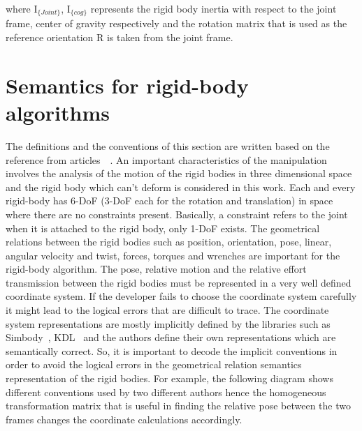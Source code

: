 where I$_{\{Joint\}}$, I$_{\{cog\}}$ represents the rigid body inertia with respect to the joint frame, center of gravity respectively and the rotation matrix that is used as the reference orientation R is taken from the joint frame. 

\section{Semantics for rigid-body algorithms}

The definitions and the conventions of this section are written based on the reference from articles~\cite{geometicsemanticspart1}~\cite{geometicsemanticspart2}. An important characteristics of the manipulation involves the analysis of the motion of the rigid bodies in three dimensional space and the rigid body which can't deform is considered in this work. Each and every rigid-body has 6-DoF (3-DoF each for the rotation and translation) in space where there are no constraints present. Basically, a constraint refers to the joint when it is attached to the rigid body, only 1-DoF exists. The geometrical relations between the rigid bodies such as position, orientation, pose, linear, angular velocity and twist, forces, torques and wrenches are important for the rigid-body algorithm. The pose, relative motion and the relative effort transmission between the rigid bodies must be represented in a very well defined coordinate system. If the developer fails to choose the coordinate system carefully it might lead to the logical errors that are difficult to trace. The coordinate system representations are mostly implicitly defined by the libraries such as Simbody~\cite{sherman2011simbody}, KDL~\cite{smits2011kdl} and the authors define their own representations which are semantically correct. So, it is important to decode the implicit conventions in order to avoid the logical errors in the geometrical relation semantics representation of the rigid bodies. For example, the following diagram shows different conventions used by two different authors hence the homogeneous transformation matrix that is useful in finding the relative pose between the two frames changes the coordinate calculations accordingly.

